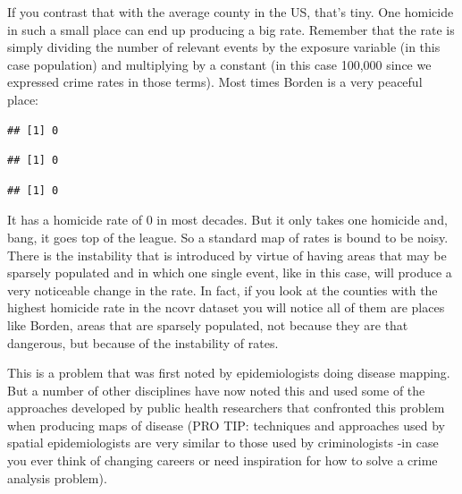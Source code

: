 \documentclass[]{book}
\newenvironment{Shaded}{\begin{snugshade}}{\end{snugshade}}
\newcommand{\NormalTok}[1]{#1}
\newcommand{\OperatorTok}[1]{\textcolor[rgb]{0.81,0.36,0.00}{\textbf{#1}}}
\begin{document}
If you contrast that with the average county in the US, that's tiny. One homicide in such a small place can end up producing a big rate. Remember that the rate is simply dividing the number of relevant events by the exposure variable (in this case population) and multiplying by a constant (in this case 100,000 since we expressed crime rates in those terms). Most times Borden is a very peaceful place:

\begin{Shaded}
\end{Shaded}

\begin{verbatim}
## [1] 0
\end{verbatim}

\begin{Shaded}
\end{Shaded}

\begin{verbatim}
## [1] 0
\end{verbatim}

\begin{Shaded}
\end{Shaded}

\begin{verbatim}
## [1] 0
\end{verbatim}

It has a homicide rate of 0 in most decades. But it only takes one homicide and, bang, it goes top of the league. So a standard map of rates is bound to be noisy. There is the instability that is introduced by virtue of having areas that may be sparsely populated and in which one single event, like in this case, will produce a very noticeable change in the rate. In fact, if you look at the counties with the highest homicide rate in the ncovr dataset you will notice all of them are places like Borden, areas that are sparsely populated, not because they are that dangerous, but because of the instability of rates.

This is a problem that was first noted by epidemiologists doing disease mapping. But a number of other disciplines have now noted this and used some of the approaches developed by public health researchers that confronted this problem when producing maps of disease (PRO TIP: techniques and approaches used by spatial epidemiologists are very similar to those used by criminologists -in case you ever think of changing careers or need inspiration for how to solve a crime analysis problem).
\end{document}

